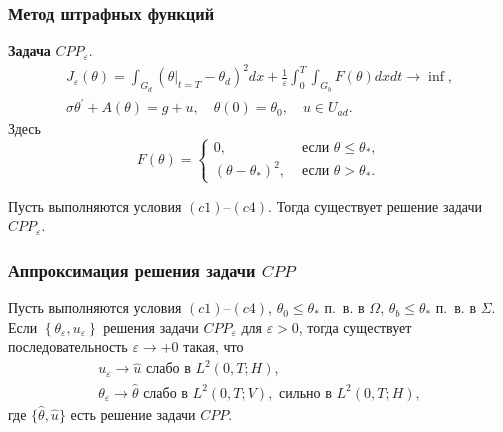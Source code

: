 \begin{frame}
    \frametitle{Метод штрафных функций}

    \textbf{Задача} $CPP_{\varepsilon}$.
    \[
        \begin{gathered}
            J_{\varepsilon}(\theta)=\int_{G_{d}}
            \left(\left.\theta\right|_{t=T}
            -\theta_{d}\right)^{2} d x
            + \frac{1}{\varepsilon} \int_{0}^{T} \int_{G_{b}} F(\theta) d x d t \rightarrow \inf, \\
            \sigma \theta^{\prime}+A(\theta)=g+u, \quad \theta(0)=\theta_{0}, \quad u \in U_{a d}.
        \end{gathered}
    \]
    Здесь
    \[
        F(\theta)=
        \begin{cases}
            0, & \text { если } \theta \leq \theta_{*}, \\
            \left(\theta-\theta_{*}\right)^{2}, & \text { если } \theta>\theta_{*}.
        \end{cases}
    \]
    \begin{theorem}[3.5]
        \label{th:3_3:2}
        Пусть выполняются условия $(c1)$--$(c4)$.
        Тогда существует решение задачи $CPP_{\varepsilon}$.
    \end{theorem}
\end{frame}

\begin{frame}
    \frametitle{Аппроксимация решения задачи $CPP$}
    \begin{theorem}[3.6]
        Пусть выполняются условия $(c1)$--$(c4)$,
        $\theta_{0} \leq \theta_{*}$ п.\ в. в $\Omega$, $\theta_{b} \leq \theta_{*}$ п.\ в. в
        $\Sigma$.
        Если $\left\{\theta_{\varepsilon}, u_{\varepsilon}\right\}$ решения задачи
        $CPP_{\varepsilon}$ для $\varepsilon>0$, тогда существует последовательность
        $\varepsilon \rightarrow+0$ такая, что
        \[
            \begin{gathered}
                u_{\varepsilon} \rightarrow \widehat{u} \text{ слабо в } L^{2}(0, T ; H), \\
                \theta_{\varepsilon} \rightarrow \widehat{\theta}
                \text{ слабо в } L^{2}(0, T ; V),\text{ сильно в } L^{2}(0, T ; H),
            \end{gathered}
        \]
        где
        $\{\widehat{\theta}, \widehat{u}\}$ есть решение задачи $CPP$.
    \end{theorem}
\end{frame}



